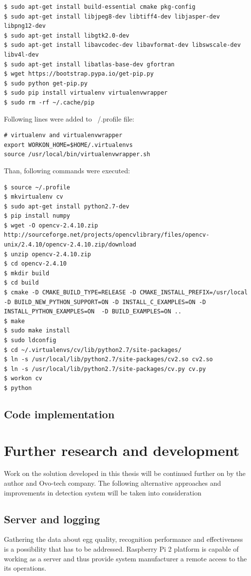 \documentclass[12pt,twoside,a4paper]{article}
\begin{document}
\begin{lstlisting}
$ sudo apt-get install build-essential cmake pkg-config
$ sudo apt-get install libjpeg8-dev libtiff4-dev libjasper-dev libpng12-dev
$ sudo apt-get install libgtk2.0-dev
$ sudo apt-get install libavcodec-dev libavformat-dev libswscale-dev libv4l-dev
$ sudo apt-get install libatlas-base-dev gfortran
$ wget https://bootstrap.pypa.io/get-pip.py
$ sudo python get-pip.py
$ sudo pip install virtualenv virtualenvwrapper
$ sudo rm -rf ~/.cache/pip
\end{lstlisting}
Following lines were added to ~/.profile file:
\begin{lstlisting}
# virtualenv and virtualenvwrapper
export WORKON_HOME=$HOME/.virtualenvs
source /usr/local/bin/virtualenvwrapper.sh
\end{lstlisting}
Than, following commands were executed:
\begin{lstlisting}
$ source ~/.profile
$ mkvirtualenv cv
$ sudo apt-get install python2.7-dev
$ pip install numpy
$ wget -O opencv-2.4.10.zip http://sourceforge.net/projects/opencvlibrary/files/opencv-unix/2.4.10/opencv-2.4.10.zip/download
$ unzip opencv-2.4.10.zip
$ cd opencv-2.4.10
$ mkdir build
$ cd build
$ cmake -D CMAKE_BUILD_TYPE=RELEASE -D CMAKE_INSTALL_PREFIX=/usr/local -D BUILD_NEW_PYTHON_SUPPORT=ON -D INSTALL_C_EXAMPLES=ON -D INSTALL_PYTHON_EXAMPLES=ON  -D BUILD_EXAMPLES=ON ..
$ make
$ sudo make install
$ sudo ldconfig
$ cd ~/.virtualenvs/cv/lib/python2.7/site-packages/
$ ln -s /usr/local/lib/python2.7/site-packages/cv2.so cv2.so
$ ln -s /usr/local/lib/python2.7/site-packages/cv.py cv.py
$ workon cv
$ python
\end{lstlisting}

\subsection{Code implementation}




\section{Further research and development}

Work on the solution developed in this thesis will be continued further on by the author and Ovo-tech company.
The following alternative approaches and improvements in detection system will be taken into consideration

\subsection{Server and logging}
Gathering the data about egg quality, recognition performance and effectiveness is a possibility that has to be addressed.
Raspberry Pi 2 platform is capable of working as a server and thus provide system manufacturer a remote access to the its operations.
\end{document}
